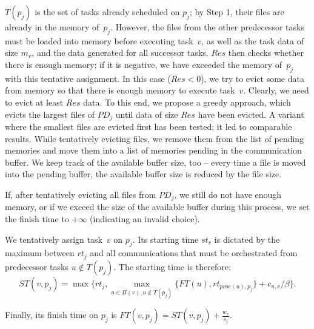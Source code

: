 \documentclass[conference]{IEEEtran}
\newcommand{\PD}{PD}
\newcommand{\AB}[1]{{\color{purple}[AB: #1]}}
\begin{document}
$T(p_j)$ is the set of tasks already scheduled on $p_j$; by Step 1, their files are
already in the memory of~$p_j$. However, the files from the
other predecessor tasks must be loaded into memory before executing task~$v$,
as well as the task data of size $m_v$, and the data generated for all successor tasks.
$Res$ then checks whether there is enough memory; if it is negative,
we have exceeded the memory of~$p_j$ with this tentative assignment.
%
In this case ($Res <0$), we try to evict some data from memory so that there is enough memory to execute task~$v$.
Clearly, we need to evict at least $Res$ data.
To this end, we propose a greedy approach, which evicts the largest files of $\PD_j$ until data of size $Res$ have been evicted. 
A variant where the smallest files are evicted first has been tested; it led to comparable results. 
%    
While tentatively evicting files, we remove them from the list of pending memories and move them into a list
of memories pending in the communication buffer.
We keep track of the available buffer size, too -- every time a file is moved into the pending buffer, 
the available buffer size is reduced by the file size.

If, after tentatively evicting all files from $\PD_j$, we still do not have enough memory, or if we exceed the size of the available buffer during this process, we set the finish time to $+\infty$ (indicating an invalid choice).


\smallskip
{} We tentatively assign task~$v$ on $p_j$.
Its starting time $st_v$ is dictated by the maximum between $rt_j$ and all communications that
must be orchestrated from predecessor tasks $u\notin T(p_j)$.
The starting time is therefore:\\[-.7cm]

{\footnotesize{ \[ST(v, p_j) = \max{ \{rt_j, \max_{ u \in \Pi(v), u\notin T(p_j)}\{ FT(u) , rt_{proc(u), p_j}\} + c_{u,v} / \beta \} .} \]}}

\noindent  Finally, its finish time on $p_j$ is 
$FT(v,p_j) = ST(v, p_j) + \frac{w_v}{s_j}$.
\end{document}
